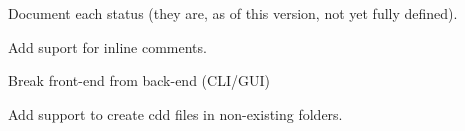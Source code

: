 
\begin{DoxyRefList}
\item[\label{todo__todo000001}%
\hypertarget{todo__todo000001}{}%
Member \hyperlink{cdcdefs_8h_a7a1ca742b5a041762c1b5784532bd7fd}{C\+D\+C\+\_\+status} ]Document each status (they are, as of this version, not yet fully defined).  
\item[\label{todo__todo000002}%
\hypertarget{todo__todo000002}{}%
File \hyperlink{configurationfileparser_8h}{configurationfileparser.h} ]Add suport for inline comments.  
\item[\label{todo__todo000003}%
\hypertarget{todo__todo000003}{}%
File \hyperlink{projectworker_8h}{projectworker.h} ]Break front-\/end from back-\/end (C\+L\+I/\+G\+U\+I) 

Add support to create cdd files in non-\/existing folders. 
\end{DoxyRefList}